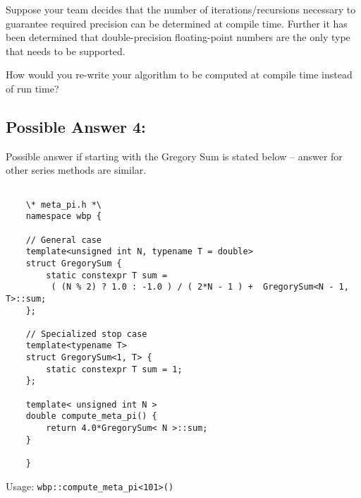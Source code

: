 \documentclass[letterpaper,11pt]{article}
\begin{document}
Suppose your team decides that the number of iterations/recursions necessary
to guarantee required precision can be determined
 at compile time. Further it has been determined that
 double-precision floating-point numbers are the only type that needs to be
 supported.

 How would you re-write your algorithm to be
 computed at compile time instead of run time?

\subsection*{Possible Answer 4:}

Possible answer if starting with the Gregory Sum is stated below -- answer for
other series methods are similar.

\begin{verbatim}

    \* meta_pi.h *\
    namespace wbp {

    // General case
    template<unsigned int N, typename T = double>
    struct GregorySum {
        static constexpr T sum =
         ( (N % 2) ? 1.0 : -1.0 ) / ( 2*N - 1 ) +  GregorySum<N - 1, T>::sum;
    };

    // Specialized stop case
    template<typename T>
    struct GregorySum<1, T> {
        static constexpr T sum = 1;
    };

    template< unsigned int N >
    double compute_meta_pi() {
        return 4.0*GregorySum< N >::sum;
    }

    }
\end{verbatim}

Usage: \verb|wbp::compute_meta_pi<101>()|
\end{document}
